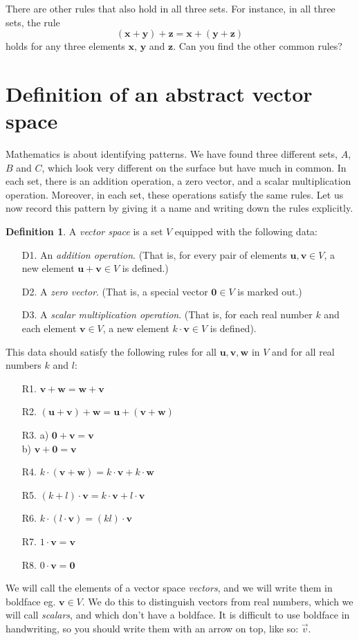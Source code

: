 \documentclass[a4paper,11pt]{book}
\theoremstyle{definition}
\newtheorem{definition}[theorem]{Definition}
\newcommand{\be}{\begin{equation}}
\newcommand{\ee}{\end{equation}}
\newcommand{\ve}[1]{\mathbf{#1}}
\begin{document}
There are other rules that also hold in all three sets. For instance, in all three sets, the rule
\be
 (\ve{x} + \ve{y}) + \ve{z} = \ve{x} + (\ve{y} + \ve{z})
\ee
holds for any three elements $\ve{x}$, $\ve{y}$ and $\ve{z}$. Can you find the other common rules?

\section{Definition of an abstract vector space} \label{Ch1Sec2DefVectorSpace}
Mathematics is about identifying patterns. We have found three different sets, $A$, $B$ and $C$, which look very different on the surface but have much in common. In each set, there is an addition operation, a zero vector, and a scalar multiplication operation. Moreover, in each set, these operations satisfy the same rules. Let us now record this pattern by giving it a name and writing down the rules explicitly. 

\begin{definition}\label{real_vec_space} A {\em vector space} is a set $V$ equipped with the following data: \label{defnvec}
\begin{itemize}
 \item[D1.] An {\em addition operation}. (That is, for every pair of elements $\ve{u}, \ve{v} \in V$, a new element  $\ve{u} + \ve{v} \in V$ is defined.)
 \item[D2.] A {\em zero vector}. (That is, a special vector $\ve{0} \in V$ is marked out.)
 \item[D3.] A {\em scalar multiplication operation}. (That is, for each real number $k$ and each element $\ve{v} \in V$, a new element $k \cdot \ve{v} \in V$ is defined).
\end{itemize}

This data should satisfy the following rules for all $\ve{u}, \ve{v}, \ve{w}$ in $V$ and for all real numbers $k$ and $l$:
 \begin{enumerate}
 	\item[R1.] $\ve{v} + \ve{w} = \ve{w} + \ve{v}$  
	\item[R2.] $(\ve{u} + \ve{v}) + \ve{w} = \ve{u} + (\ve{v} + \ve{w})$
	\item[R3.] a) $\ve{0} + \ve{v} = \ve{v}$ \\ 
	b) $\ve{v} + \ve{0} = \ve{v}$
	\item[R4.] $k \cdot (\ve{v} + \ve{w}) = k \cdot \ve{v} + k \cdot \ve{w}$
	\item[R5.] $(k + l) \cdot \ve{v} = k \cdot \ve{v} + l \cdot {\ve{v}}$
	\item[R6.] $k \cdot (l \cdot \ve{v}) = (kl) \cdot \ve{v}$
	\item[R7.] $1 \cdot \ve{v} = \ve{v}$
	\item[R8.] $0 \cdot \ve{v} = \ve{0}$	
 \end{enumerate}
\end{definition}
We will call the elements of a vector space {\em vectors}, and we will write them in boldface eg. $\ve{v} \in V$. We do this to distinguish vectors from real numbers, which we will call {\em scalars}, and which don't have a boldface. It is difficult to use boldface in handwriting, so you should write them with an arrow on top, like so: $\vec{v}$.
\end{document}
